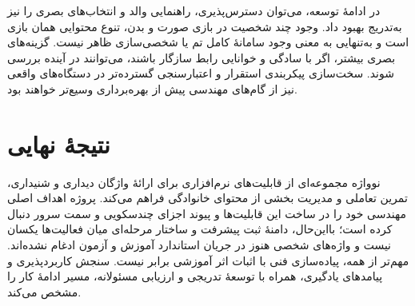 در ادامهٔ توسعه، می‌توان دسترس‌پذیری، راهنمایی والد و انتخاب‌های بصری را نیز به‌تدریج بهبود داد. وجود چند شخصیت در بازی صورت و بدن، تنوع محتوایی همان بازی است و به‌تنهایی به معنی وجود سامانهٔ کامل تم یا شخصی‌سازی ظاهر نیست. گزینه‌های بصری بیشتر، اگر با سادگی و خوانایی رابط سازگار باشند، می‌توانند در آینده بررسی شوند. سخت‌سازی پیکربندی استقرار و اعتبارسنجی گسترده‌تر در دستگاه‌های واقعی نیز از گام‌های مهندسی پیش از بهره‌برداری وسیع‌تر خواهند بود.

\section{نتیجهٔ نهایی}

نوواژه مجموعه‌ای از قابلیت‌های نرم‌افزاری برای ارائهٔ واژگان دیداری و شنیداری، تمرین تعاملی و مدیریت بخشی از محتوای خانوادگی فراهم می‌کند. پروژه اهداف اصلی مهندسی خود را در ساخت این قابلیت‌ها و پیوند اجزای چندسکویی و سمت سرور دنبال کرده است؛ بااین‌حال، دامنهٔ ثبت پیشرفت و ساختار مرحله‌ای میان فعالیت‌ها یکسان نیست و واژه‌های شخصی هنوز در جریان استاندارد آموزش و آزمون ادغام نشده‌اند. مهم‌تر از همه، پیاده‌سازی فنی با اثبات اثر آموزشی برابر نیست. سنجش کاربردپذیری و پیامدهای یادگیری، همراه با توسعهٔ تدریجی و ارزیابی مسئولانه، مسیر ادامهٔ کار را مشخص می‌کند.
